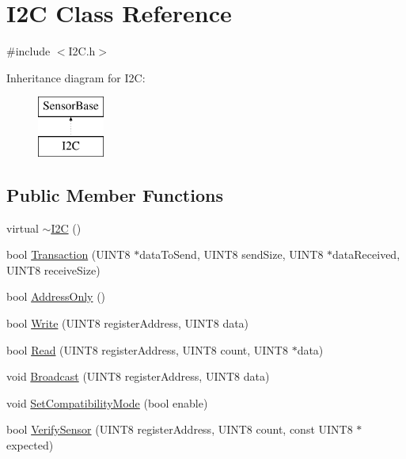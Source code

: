 \hypertarget{classI2C}{\section{\-I2\-C \-Class \-Reference}
\label{classI2C}
}


{\ttfamily \#include $<$\-I2\-C.\-h$>$}

\-Inheritance diagram for \-I2\-C\-:\begin{figure}[H]
\begin{center}
\leavevmode
\includegraphics[height=2.000000cm]{classI2C}
\end{center}
\end{figure}
\subsection*{\-Public \-Member \-Functions}
\begin{DoxyCompactItemize}
\item 
virtual \hyperlink{classI2C_afaad09fa9bdd23623bddbdcd7585a9fe}{$\sim$\-I2\-C} ()
\item 
bool \hyperlink{classI2C_ad2b8c000febc0a7c2444844da3a1886a}{\-Transaction} (\-U\-I\-N\-T8 $\ast$data\-To\-Send, \-U\-I\-N\-T8 send\-Size, \-U\-I\-N\-T8 $\ast$data\-Received, \-U\-I\-N\-T8 receive\-Size)
\item 
bool \hyperlink{classI2C_a8aaad56f53bdbc0817a6d70ce0361fcd}{\-Address\-Only} ()
\item 
bool \hyperlink{classI2C_a789fbbfb29d01484527996c26b618b80}{\-Write} (\-U\-I\-N\-T8 register\-Address, \-U\-I\-N\-T8 data)
\item 
bool \hyperlink{classI2C_ae50e3e7fb5c896762c6a785f8d85cdc2}{\-Read} (\-U\-I\-N\-T8 register\-Address, \-U\-I\-N\-T8 count, \-U\-I\-N\-T8 $\ast$data)
\item 
void \hyperlink{classI2C_aab8d364d14d9265a399c7e0730213672}{\-Broadcast} (\-U\-I\-N\-T8 register\-Address, \-U\-I\-N\-T8 data)
\item 
void \hyperlink{classI2C_af4c0a331591f394ae78e3ab03c0d6520}{\-Set\-Compatibility\-Mode} (bool enable)
\item 
bool \hyperlink{classI2C_a0d2101f590b7df2034c4239896f071c3}{\-Verify\-Sensor} (\-U\-I\-N\-T8 register\-Address, \-U\-I\-N\-T8 count, const \-U\-I\-N\-T8 $\ast$expected)
\end{DoxyCompactItemize}
